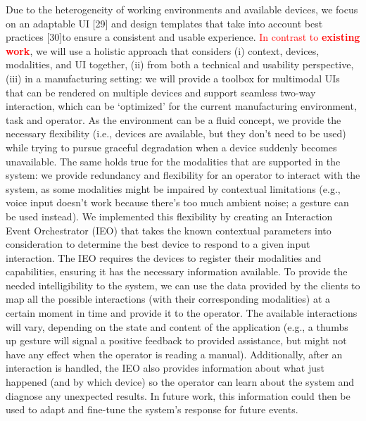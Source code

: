 Due to the heterogeneity of working environments and available devices, we focus on an adaptable UI [29] and design templates that take into account best practices [30]to ensure a consistent and usable experience. 
\textcolor{red}{In contrast to \textbf{existing work}}, we will use a holistic approach that considers (i) context, devices, modalities, and UI together, (ii) from both a technical and usability perspective, (iii) in a manufacturing setting: we will provide a toolbox for multimodal UIs that can be rendered on multiple devices and support seamless two-way interaction, which can be ‘optimized’ for the current manufacturing environment, task and operator\iffalse\textcolor{red}{ (see figure 1 for a practical example)}\fi. As the environment can be a fluid concept, we provide the necessary flexibility (i.e., devices are available, but they don't need to be used) while trying to pursue graceful degradation when a device suddenly becomes unavailable. 
The same holds true for the modalities that are supported in the system: we provide redundancy and flexibility for an operator to interact with the system, as some modalities might be impaired by contextual limitations (e.g., voice input doesn't work because there's too much ambient noise; a gesture can be used instead).
We implemented this flexibility by creating an Interaction Event Orchestrator (IEO) that takes the known contextual parameters into consideration to determine the best device to respond to a given input interaction. The IEO requires the devices to register their modalities and capabilities, ensuring it has the necessary information available.
To provide the needed intelligibility to the system, we can use the data provided by the clients to map all the possible interactions (with their corresponding modalities) at a certain moment in time and provide it to the operator. The available interactions will vary, depending on the state and content of the application (e.g., a thumbs up gesture will signal a positive feedback to provided assistance, but might not have any effect when the operator is reading a manual). 
Additionally, after an interaction is handled, the IEO also provides information about what just happened (and by which device) so the operator can learn about the system and diagnose any unexpected results. In future work, this information could then be used to adapt and fine-tune the system's response for future events.

